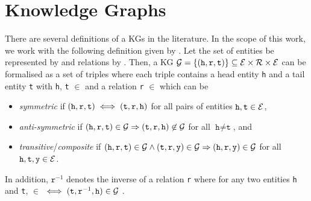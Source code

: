 \section{Knowledge Graphs} 
\label{sec:knowledge_graphs}

There are several definitions of a \acp{KG} in the literature. 
In the scope of this work, we work with the following definition given by \cite{ConEx, RotatE}.
Let the set of entities be represented by \entities and relations by \relations.
Then, a \ac{KG} $\mathcal{G}= \{(\texttt{h}, \texttt{r}, \texttt{t}) \}  \subseteq \mathcal{E} \times \mathcal{R} \times \mathcal{E}$ can be formalised as a set of triples where each triple contains a head entity \texttt{h} and a tail entity \texttt{t} with \texttt{h}, \texttt{t} $\in$ \entities and a relation \texttt{r} $\in$ \relations which can be \cite{ConEx}
\begin{itemize}
    \item 
    \emph{symmetric} if $(\texttt{h}, \texttt{r}, \texttt{t}) \iff (\texttt{t}, \texttt{r}, \texttt{h})$ for all pairs of entities $\texttt{h},\texttt{t}\in \mathcal{E}$, 
   
   \item 
   \emph{anti-symmetric} if $(\texttt{h}, \texttt{r}, \texttt{t}) \in \mathcal{G} \Rightarrow (\texttt{t}, \texttt{r}, \texttt{h}) \not \in \mathcal{G}$ for all $\texttt{h} \not= \texttt{t}$, and
    
    \item 
    \emph{transitive}/\emph{composite} if $(\texttt{h}, \texttt{r}, \texttt{t})\in\mathcal{G} \wedge (\texttt{t}, \texttt{r}, \texttt{y}) \in \mathcal{G}  \Rightarrow (\texttt{h}, \texttt{r}, \texttt{y}) \in \mathcal{G}$ for all $\texttt{h},\texttt{t},\texttt{y}\in \mathcal{E}$.
\end{itemize}
In addition, $\texttt{r}^{-1}$ denotes the inverse of a relation \texttt{r} where for any two entities \texttt{h} and \texttt{t},  $\in$ \kg $\iff (\texttt{t},\texttt{r}^{-1},\texttt{h}) \in \mathcal{G}$ \cite{ConEx}.
